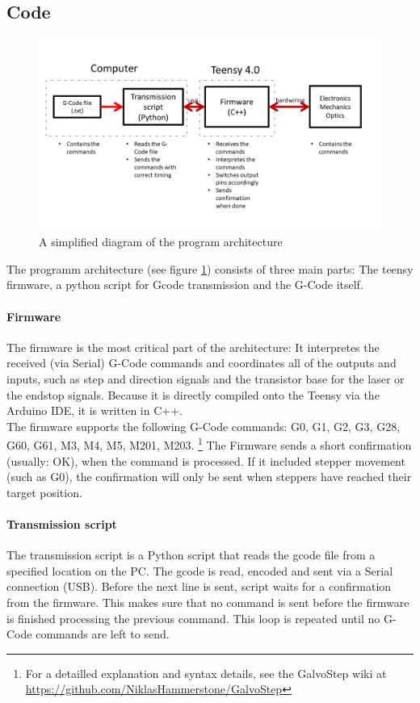 \documentclass[a4paper, 11pt]{scrartcl}
\begin{document}
\subsection{Code}
\begin{figure}[H]
\begin{center}
\includegraphics[width=15cm]{img/programArchitecture.png}
\caption{A simplified diagram of the program architecture}
\label{code}
\end{center}
\end{figure}
The programm architecture (see figure \ref{code}) consists of three main parts: The teensy firmware, a python script for Gcode transmission and the G-Code itself. 
\paragraph{Firmware}
The firmware is the most critical part of the architecture: It interpretes the received (via Serial) G-Code commands and coordinates all of the outputs and inputs, such as step and direction signals and the transistor base for the laser or the endstop signals. Because it is directly compiled onto the Teensy via the Arduino IDE, it is written in C++.\\
The firmware supports the following G-Code commands: G0, G1, G2, G3, G28, G60, G61, M3, M4, M5, M201, M203. \footnote{For a detailled explanation and syntax details, see the GalvoStep wiki at \url{https://github.com/NiklasHammerstone/GalvoStep}} The Firmware sends a short confirmation (usually: OK), when the command is processed. If it included stepper movement (such as G0), the confirmation will only be sent when steppers have reached their target position.
\paragraph{Transmission script}
The transmission script is a Python script that reads the gcode file from a specified location on the PC. The gcode is read, encoded and sent via a Serial connection (USB). Before the next line is sent, script waits for a confirmation from the firmware. This makes sure that no command is sent before the firmware is finished processing the previous command. This loop is repeated until no G-Code commands are left to send.
\end{document}
